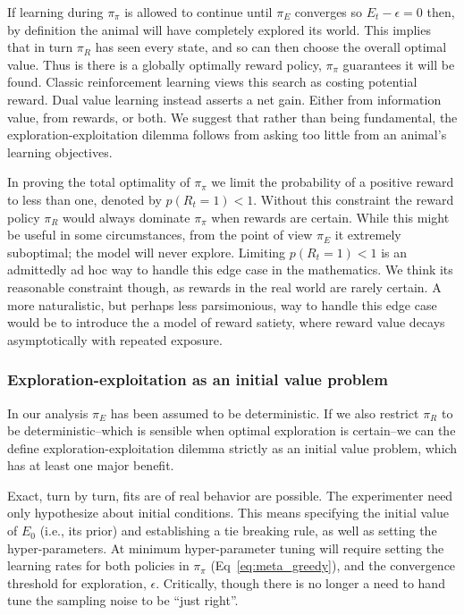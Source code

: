 \documentclass[9pt,twocolumn,twoside]{pnas-new}
\begin{document}
If learning during $\pi_{\pi}$ is allowed to continue until $\pi_E$ converges so $E_t - \epsilon = 0$ then, by definition the animal will have completely explored its world. This implies that in turn $\pi_R$ has seen every state, and so can then choose the overall optimal value. Thus is there is a globally optimally reward policy, $\pi_{\pi}$ guarantees it will be found. Classic reinforcement learning views this search as costing potential reward. Dual value learning instead asserts a net gain. Either from information value, from rewards, or both. We suggest that rather than being fundamental, the exploration-exploitation dilemma follows from asking too little from an animal's learning objectives.

In proving the total optimality of $\pi_{\pi}$ we limit the probability of a positive reward to less than one, denoted by $p(R_t = 1) < 1$. Without this constraint the reward policy $\pi_R$ would always dominate $\pi_{\pi}$ when rewards are certain. While this might be useful in some circumstances, from the point of view $\pi_E$ it extremely suboptimal; the model will never explore. Limiting $p(R_t = 1) < 1$ is an admittedly ad hoc way to handle this edge case in the mathematics. We think its reasonable constraint though, as rewards in the real world are rarely certain. A more naturalistic, but perhaps less parsimonious, way to handle this edge case would be to introduce the a model of reward satiety, where reward value decays asymptotically with repeated exposure. 

\subsubsection*{Exploration-exploitation as an initial value problem}
In our analysis $\pi_E$ has been assumed to be deterministic. If we also restrict $\pi_R$ to be deterministic--which is sensible when optimal exploration is certain--we can the define exploration-exploitation dilemma strictly as an initial value problem, which has at least one major benefit.

Exact, turn by turn, fits are of real behavior are possible. The experimenter need only hypothesize about initial conditions. This means specifying the initial value of $E_0$ (i.e., its prior) and establishing a tie breaking rule, as well as setting the hyper-parameters. At minimum hyper-parameter tuning will require setting the learning rates for both policies in $\pi_{\pi}$ (Eq~\ref{eq:meta_greedy}), and the convergence threshold for exploration, $\epsilon$. Critically, though there is no longer a need to hand tune the sampling noise to be ``just right''. %
\end{document}
